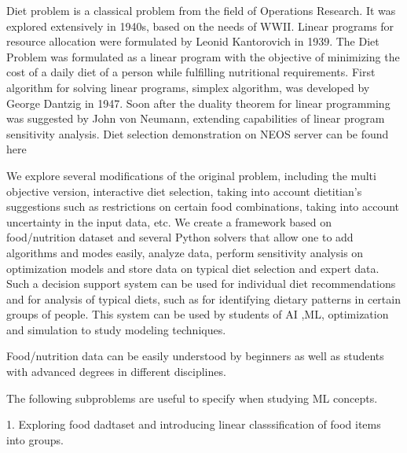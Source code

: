 Diet problem is a classical problem from the field of Operations Research.  It was explored extensively in 1940s, based on the needs of WWII. Linear programs for resource allocation were formulated by Leonid Kantorovich in 1939. The Diet Problem was formulated as a linear program with the objective of minimizing the cost of a daily diet of a person while fulfilling nutritional requirements. First algorithm for solving linear programs, simplex algorithm, was developed by George Dantzig in 1947. Soon after the duality theorem for linear programming was suggested by John von Neumann, extending capabilities of linear program sensitivity analysis. 
Diet selection demonstration on NEOS server can be found here \cite{neos}

We explore several modifications of the original problem, including the multi objective version, interactive diet selection, taking into account dietitian’s suggestions such as restrictions on certain food combinations, taking into account uncertainty in the input data, etc. We create a framework based on food/nutrition dataset and several Python solvers that allow one to add algorithms and modes easily, analyze data, perform sensitivity analysis on optimization models and store data on typical diet selection and expert data. Such a decision support system can be used for individual diet recommendations and for analysis of typical diets, such as for identifying dietary patterns in certain groups of people. This system can be used by students of AI ,ML,  optimization and simulation to study modeling techniques. 

Food/nutrition data can be easily understood by beginners as well as students with advanced degrees in different disciplines.  


The following subproblems are useful to specify when studying ML concepts. 

1. Exploring food dadtaset and introducing linear classsification of food items into groups. 

